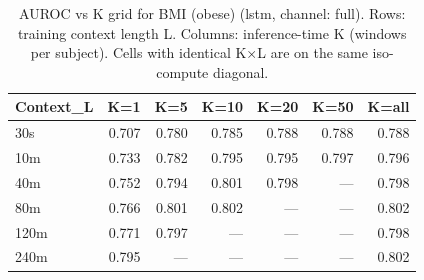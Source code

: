\begin{table}[ht]
\centering
\caption{AUROC vs K grid for BMI (obese) (lstm, channel: full). Rows: training context length L. Columns: inference-time K (windows per subject). Cells with identical K×L are on the same iso-compute diagonal.}
\label{tab:kgrid_bmi_binary_lstm_full}
\begin{tabular}{lrrrrrr}
\toprule
Context_L & K=1 & K=5 & K=10 & K=20 & K=50 & K=all \\
\midrule
30s & 0.707 & 0.780 & 0.785 & 0.788 & 0.788 & 0.788 \\
10m & 0.733 & 0.782 & 0.795 & 0.795 & 0.797 & 0.796 \\
40m & 0.752 & 0.794 & 0.801 & 0.798 & — & 0.798 \\
80m & 0.766 & 0.801 & 0.802 & — & — & 0.802 \\
120m & 0.771 & 0.797 & — & — & — & 0.798 \\
240m & 0.795 & — & — & — & — & 0.802 \\
\bottomrule
\end{tabular}
\end{table}